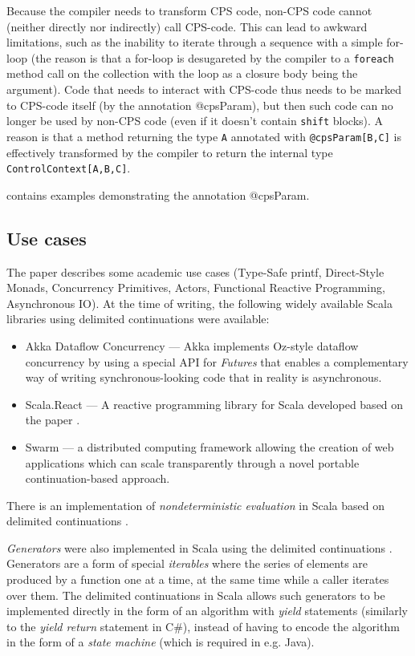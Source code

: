 Because the compiler needs to transform CPS code, non-CPS code cannot (neither directly nor indirectly) call CPS-code. This can lead to awkward limitations, such as the inability to iterate through a sequence with a simple for-loop (the reason is that a for-loop is desugareted by the compiler to a \texttt{foreach} method call on the collection with the loop as a closure body being the argument). Code that needs to interact with CPS-code thus needs to be marked to CPS-code itself (by the annotation @cpsParam), but then such code can no longer be used by non-CPS code (even if it doesn't contain \texttt{shift} blocks). A reason is that a method returning the type \texttt{A} annotated with \texttt{@cpsParam[B,C]} is effectively transformed by the compiler to return the internal type \texttt{ControlContext[A,B,C]}. 

 contains examples demonstrating the annotation @cpsParam.

\subsection{Use cases}

The paper \cite{CPSTransform} describes some academic use cases (Type-Safe printf, Direct-Style Monads, Concurrency Primitives, Actors, Functional Reactive Programming, Asynchronous IO). At the time of writing, the following widely available Scala libraries using delimited continuations were available:
\begin{itemize}
\item Akka Dataflow Concurrency --- Akka implements Oz-style dataflow concurrency by using a special API for \emph{Futures} that enables a complementary way of writing synchronous-looking code that in reality is asynchronous. \cite{AkkaDataflow}
\item Scala.React --- A reactive programming library for Scala developed based on the paper \cite{EPFL-REPORT-176887}.
\item Swarm --- a distributed computing framework allowing the creation of web applications which can scale transparently through a novel portable continuation-based approach. \cite{SwarmConcurrency}
\end{itemize}

There is an implementation of \emph{nondeterministic evaluation} in Scala based on delimited continuations \cite{ScalaNonDeterministicEvaluation}. 

\emph{Generators} were also implemented in Scala using the delimited continuations \cite{ScalaGenerators}. Generators are a form of special \emph{iterables} where the series of elements are produced by a function one at a time, at the same time while a caller iterates over them. The delimited continuations in Scala allows such generators to be implemented directly in the form of an algorithm with \emph{yield} statements (similarly to the \emph{yield return} statement in C\#), instead of having to encode the algorithm in the form of a \emph{state machine} (which is required in e.g. Java).

